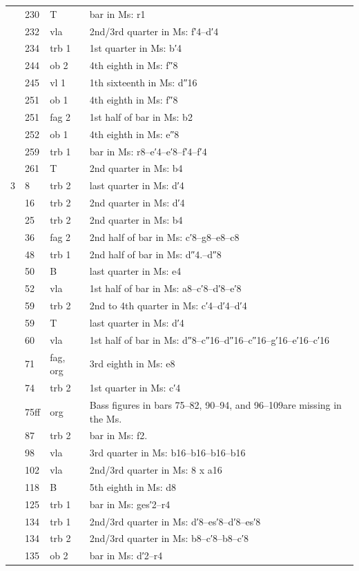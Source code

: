\documentclass[parskip=full]{scrreprt}
\begin{document}
\begin{longtable}{lll L{10cm}}
	  & 230 & T        & bar in Ms: r1 \\
	  & 232 & vla      & 2nd/3rd quarter in Ms: f′4–d′4 \\
	  & 234 & trb 1    & 1st quarter in Ms: b′4 \\
	  & 244 & ob 2     & 4th eighth in Ms: f″8 \\
	  & 245 & vl 1     & 1th sixteenth in Ms: d″16 \\
	  & 251 & ob 1     & 4th eighth in Ms: f″8 \\
	  & 251 & fag 2    & 1st half of bar in Ms: b2 \\
	  & 252 & ob 1     & 4th eighth in Ms: e″8 \\
	  & 259 & trb 1    & bar in Ms: r8–e′4–e′8–f′4–f′4 \\
	  & 261 & T        & 2nd quarter in Ms: b4 \\
	3 & 8   & trb 2    & last quarter in Ms: d′4 \\
	  & 16  & trb 2    & 2nd quarter in Ms: d′4 \\
	  & 25  & trb 2    & 2nd quarter in Ms: b4 \\
	  & 36  & fag 2    & 2nd half of bar in Ms: c′8–g8–e8–c8 \\
	  & 48  & trb 1    & 2nd half of bar in Ms: d″4.–d″8 \\
	  & 50  & B        & last quarter in Ms: e4 \\
	  & 52  & vla      & 1st half of bar in Ms: a8–c′8–d′8–e′8 \\
	  & 59  & trb 2    & 2nd to 4th quarter in Ms: c′4–d′4–d′4 \\
	  & 59  & T        & last quarter in Ms: d′4 \\
	  & 60  & vla      & 1st half of bar in Ms: d″8–c″16–d″16–c″16–g′16–e′16–c′16 \\
	  & 71  & fag, org & 3rd eighth in Ms: e8 \\
	  & 74  & trb 2    & 1st quarter in Ms: c′4 \\
	  & 75ff & org     & Bass figures in bars 75–82, 90–94, and 96–109\newline are missing in the Ms. \\
	  & 87  & trb 2    & bar in Ms: f2. \\
	  & 98  & vla      & 3rd quarter in Ms: b16–b16–b16–b16 \\
	  & 102 & vla      & 2nd/3rd quarter in Ms: 8 x a16 \\
	  & 118 & B        & 5th eighth in Ms: d8 \\
	  & 125 & trb 1    & bar in Ms: ges′2–r4 \\
	  & 134 & trb 1    & 2nd/3rd quarter in Ms: d′8–es′8–d′8–es′8 \\
	  & 134 & trb 2    & 2nd/3rd quarter in Ms: b8–c′8–b8–c′8 \\
	  & 135 & ob 2     & bar in Ms: d′2–r4 \\
	\bottomrule
\end{longtable}
\end{document}
